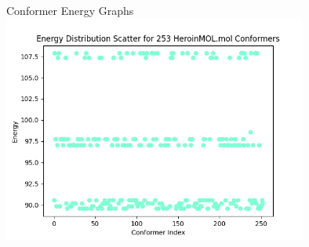 \documentclass{beamer}
\begin{document}
\begin{frame}{Conformer Energy Graphs}
\includegraphics[width=10cm]{img/Graphs/HeroinMOL_Energy_Scatter.png}
\end{frame}
\end{document}

